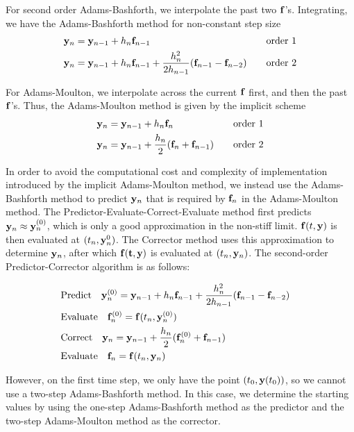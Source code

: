 \documentclass[12pt]{article}
\begin{document}
For second order Adams-Bashforth, we interpolate the past two $\vb{f}$'s. Integrating, we have the Adams-Bashforth method for non-constant step size
\begin{align}
	\vb{y}_n&=\vb{y}_{n-1}+h_n\vb{f}_{n-1}&\quad\text{order 1} \label{eq:AB_1o} \\
	\vb{y}_n&=\vb{y}_{n-1}+h_n\vb{f}_{n-1}+\frac{h_n^2}{2h_{n-1}}(\vb{f}_{n-1}-\vb{f}_{n-2})&\quad\text{order 2} \label{eq:AB_2o}
\end{align}

For Adams-Moulton, we interpolate across the current $\vb{f}$ first, and then the past $\vb{f}$'s. Thus, the Adams-Moulton method is given by the implicit scheme
\begin{align}
	\vb{y}_n&=\vb{y}_{n-1}+h_n\vb{f}_{n}&\quad\text{order 1} \label{eq:AM_1o} \\
	\vb{y}_n&=\vb{y}_{n-1}+\frac{h_n}{2}(\vb{f}_{n}+\vb{f}_{n-1})&\quad\text{order 2} \label{eq:AM_2o}
\end{align}

In order to avoid the computational cost and complexity of implementation introduced by the implicit Adams-Moulton method, we instead use the Adams-Bashforth method to predict $\vb{y}_n$ that is required by $\vb{f}_n$ in the Adams-Moulton method.
The Predictor-Evaluate-Correct-Evaluate method first predicts $\vb{y}_n\approx \vb{y}_n^{(0)}$, which is only a good approximation in the non-stiff limit.
$\vb{f}(t,\vb{y})$ is then evaluated at $(t_n,\vb{y}_n^{0})$.
The Corrector method uses this approximation to determine $\vb{y}_n$, after which $\vb{f(t,\vb{y})}$ is evaluated at $(t_n,\vb{y}_n)$.
The second-order Predictor-Corrector algorithm is as follows:

\begin{align}
	&\text{Predict} \quad \vb{y}_n^{(0)}=\vb{y}_{n-1}+h_n\vb{f}_{n-1}+\frac{h_n^2}{2h_{n-1}}(\vb{f}_{n-1}-\vb{f}_{n-2})& \nonumber \\
	&\text{Evaluate}\quad \vb{f}_n^{(0)} = \vb{f}(t_n,\vb{y}_n^{(0)}) &\nonumber \\
	&\text{Correct}\quad \vb{y}_n=\vb{y}_{n-1}+\frac{h_n}{2}(\vb{f}_{n}^{(0)}+\vb{f}_{n-1}) & \label{eq:PECE_2o} \\
	&\text{Evaluate}\quad \vb{f}_n=\vb{f}(t_n,\vb{y}_n)& \nonumber
\end{align}

However, on the first time step, we only have the point $(t_0,\vb{y}(t_0))$, so we cannot use a two-step Adams-Bashforth method.
In this case, we determine the starting values by using the one-step Adams-Bashforth method as the predictor and the two-step Adams-Moulton method as the corrector.
\end{document}
